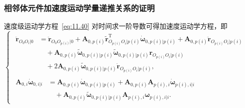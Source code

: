 \subsubsection{相邻体元件加速度运动学量递推关系的证明}

速度级运动学方程~\eqref{eq:11.40} 对时间求一阶导数可得加速度运动学方程，即
\begin{equation}\label{eq:11.47}
\begin{cases}
\begin{aligned}
\ddot{\boldsymbol{r}}_{O_0O_i|0} &= \ddot{\boldsymbol{r}}_{O_0O_{p(i)}|0}
   + \boldsymbol{A}_{0,p(i)} \tilde{\boldsymbol{r}}_{O_{p(i)}O_i|p(i)}^{\mathrm{T}} \dot{\boldsymbol{\omega}}_{0,p(i)|p(i)}
   + \boldsymbol{A}_{0,p(i)} \ddot{\boldsymbol{r}}_{O_{p(i)}O_i|p(i)} \\
   &\quad + \boldsymbol{A}_{0,p(i)} \tilde{\boldsymbol{\omega}}_{0,p(i)|p(i)} \tilde{\boldsymbol{\omega}}_{0,p(i)|p(i)} \boldsymbol{r}_{O_{p(i)}O_i|p(i)} \\
   &\quad + 2 \boldsymbol{A}_{0,p(i)} \tilde{\boldsymbol{\omega}}_{0,p(i)|p(i)} \dot{\boldsymbol{r}}_{O_{p(i)}O_i|p(i)},
\end{aligned} \\[12pt]
\begin{aligned}
\boldsymbol{A}_{0,i} \dot{\boldsymbol{\omega}}_{0,i|i} &= \boldsymbol{A}_{0,p(i)} \dot{\boldsymbol{\omega}}_{0,p(i)|p(i)}
   + \boldsymbol{A}_{0,p(i)} \boldsymbol{A}_{p(i),i} \dot{\boldsymbol{\omega}}_{p(i),i|i} \\
   &\quad + \boldsymbol{A}_{0,p(i)} \tilde{\boldsymbol{\omega}}_{0,p(i)|p(i)} \boldsymbol{A}_{p(i),i} \boldsymbol{\omega}_{p(i),i|i}.
\end{aligned}
\end{cases}
\end{equation}

